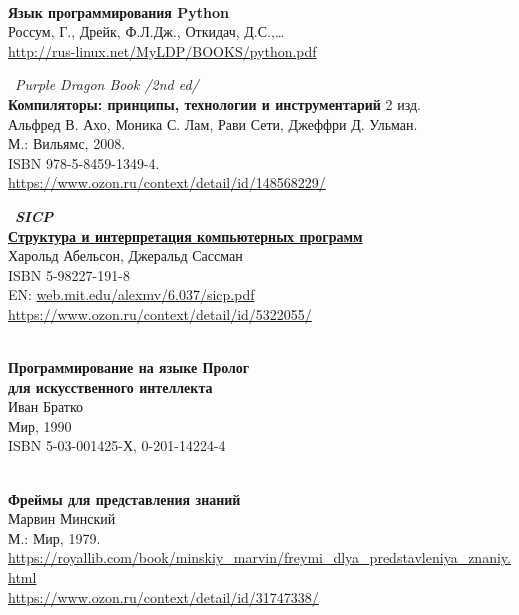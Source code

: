 \begin{thebibliography}{99}

\clearpage
{}\ \\
\textbf{Язык программирования Python}\\
Россум, Г., Дрейк, Ф.Л.Дж., Откидач, Д.С.,\ldots\\
\url{http://rus-linux.net/MyLDP/BOOKS/python.pdf}

\clearpage
{} \ \emph{Purple Dragon Book /2nd ed/}\\
\textbf{Компиляторы: принципы, технологии и инструментарий} 2 изд.\\
Альфред В. Ахо, Моника С. Лам, Рави Сети, Джеффри Д. Ульман.\\
М.: Вильямс, 2008.\\ ISBN 978-5-8459-1349-4.\\
\url{https://www.ozon.ru/context/detail/id/148568229/}

\clearpage
{} \ \textbf{\emph{SICP}\\
\href{https://drive.google.com/file/d/0B0u4WeMjO894X3lnWmhjUktKRk0/view?usp=sharing}{Структура
и интерпретация компьютерных программ}}\\
Харольд Абельсон, Джеральд Сассман\\
ISBN 5-98227-191-8\\
EN: \url{web.mit.edu/alexmv/6.037/sicp.pdf}\\
\url{https://www.ozon.ru/context/detail/id/5322055/}

\clearpage
{}\ \\
\textbf{Программирование на языке Пролог\\для искусственного интеллекта}\\
Иван Братко\\
Мир, 1990\\ ISBN 5-03-001425-Х, 0-201-14224-4

\clearpage
{}\ \\
\textbf{Фреймы для представления знаний}\\
Марвин Минский\\
 М.: Мир, 1979.\\
\url{https://royallib.com/book/minskiy_marvin/freymi_dlya_predstavleniya_znaniy.html}\\
\url{https://www.ozon.ru/context/detail/id/31747338/}


\end{thebibliography}

